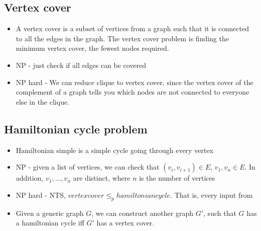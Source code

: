 \subsection{Vertex cover}
\begin{itemize}
    \item A vertex cover is a subset of vertices from a graph such that it is connected to all the edges in the graph. The vertex cover problem is finding the minimum vertex cover, the fewest nodes required.
    \item NP - just check if all edges can be covered
    \item NP hard - We can reduce clique to vertex cover, since the vertex cover of the complement of a graph tells you which nodes are not connected to everyone else in the clique.
\end{itemize}
\subsection{Hamiltonian cycle problem}
\begin{itemize}
    \item Hamiltonian simple is a simple cycle going through every vertex
    \item NP - given a list of vertices, we can check that $(v_i, v_{i+1}) \in E$, ${v_1, v_n} \in E$. In addition, $v_1,\dots, v_n$ are distinct, where $n$ is the number of vertices
    \item NP hard - NTS, $vertex cover \leq_{p} hamiltonian cycle$. That is, every input from
    \item Given a generic graph $G$, we can construct another graph $G'$, such that $G$ has a hamiltonian cycle iff $G'$ has a vertex cover.
\end{itemize}